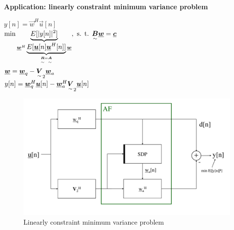 \begin{doublespace}
\textbf{Application: linearly constraint minimum variance problem}

$y[n]=\vec{w}^H\vec{u}[n]$\\
$\min \underbrace{E[|y[n]|^2]}_{\vec{w}^H \underbrace{E[\vec{u}[n]\vec{u}^H[n]]}_{\ma{R}=\ma{A}}\vec{w}}, \text{ s. t. } \ma{B}\vec{w}=\vec{c}$\\
$\vec{w}=\vec{w}_q-\ma{V}_2\vec{w}_a$\\
$y[n]=\vec{w}_q^H\vec{u}[n]-\vec{w}_a^H\ma{V}_2\vec{u}[n]$\\

\begin{figure}[H]
	\centering
		\includegraphics[trim =0cm 1.5cm 1cm 0cm, clip, width=1.00\textwidth]{graphics/Linearly_constraint_minimum_variance_problem.pdf}
	\caption{Linearly constraint minimum variance problem}
	\label{fig:Linearly_constraint_minimum_variance_problem}
\end{figure}
\end{doublespace}

